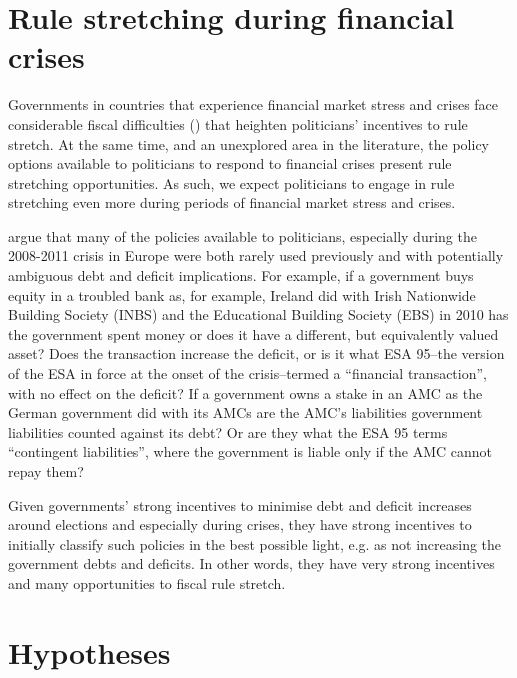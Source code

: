 \documentclass[]{article}
\begin{document}
\cite{DeCastro2013} 

\section{Rule stretching during financial crises}

Governments in countries that experience financial market stress and crises face considerable fiscal difficulties (\cite[see][]{Laeven2012}) that heighten politicians' incentives to rule stretch. At the same time, and an unexplored area in the literature, the policy options available to politicians to respond to financial crises present rule stretching opportunities. As such, we expect politicians to engage in rule stretching even more during periods of financial market stress and crises.

\cite{GandrudHallerberg2016} argue that many of the policies available to politicians, especially during the 2008-2011 crisis in Europe were both rarely used previously and with potentially ambiguous debt and deficit implications. For example, if a government buys equity in a troubled bank as, for example, Ireland did with Irish Nationwide Building Society (INBS) and the Educational Building Society (EBS) in 2010 has the government spent money or does it have a different, but equivalently valued asset? Does the transaction increase the deficit, or is it what ESA 95--the version of the ESA in force at the onset of the crisis--termed a ``financial transaction'', with no effect on the deficit? If a government owns a stake in an AMC as the German government did with its AMCs are the AMC's liabilities government liabilities counted against its debt? Or are they what the ESA 95 terms ``contingent liabilities'', where the government is liable only if the AMC cannot repay them?

Given governments' strong incentives to minimise debt and deficit increases around elections and especially during crises, they have strong incentives to initially classify such policies in the best possible light, e.g. as not increasing the government debts and deficits. In other words, they have very strong incentives and many opportunities to fiscal rule stretch.

\section{Hypotheses}
\end{document}
